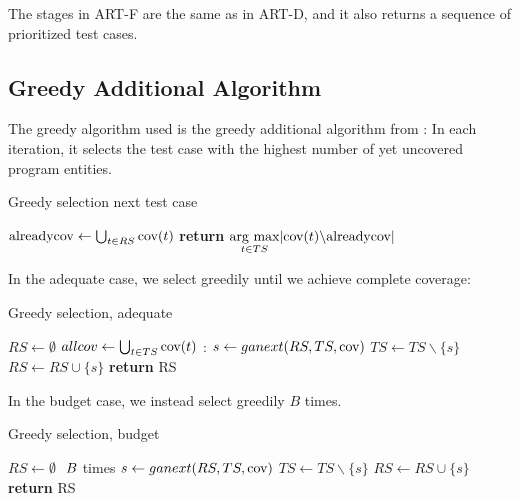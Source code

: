 The stages in ART-F are the same as in ART-D, and it also returns a
sequence of prioritized test cases.

\subsection{Greedy Additional Algorithm}

The greedy algorithm used is the greedy additional algorithm from
\cite{rothermel2001prioritizing}: In each iteration, it selects the test
case with the highest number of yet uncovered program entities.

\begin{algorithm}
\caption[Greedy selection next test case]{Greedy selection next test case}\label{code:ganext}
\begin{algorithmic}
	\State $\hbox{alreadycov} \gets \bigcup_{t \in RS} \hbox{cov}(t)$
	\State \textbf{return} $\underset{t \in TS}{\hbox{arg max}} |\hbox{cov}(t)\backslash \hbox{alreadycov}|$
\EndFunction
\end{algorithmic}
\end{algorithm}

In the adequate case, we select greedily until we achieve complete
coverage:

\begin{algorithm}
\caption[Greedy selection, adequate]{Greedy selection, adequate}\label{code:gaadequate}
\begin{algorithmic}
	\State $RS \gets \emptyset$
	\State $allcov \gets \bigcup_{t \in TS} \hbox{cov}(t)$
	:
		\State $s \gets ganext(RS, TS, \hbox{cov})$
		\State $TS \gets TS \backslash \{s\}$
		\State $RS \gets RS \cup \{s\}$
	\EndWhile
	\State \textbf{return} RS
\EndFunction
\end{algorithmic}
\end{algorithm}

In the budget case, we instead select greedily $B$ times.

\begin{algorithm}
\caption[Greedy selection, budget]{Greedy selection, budget}\label{code:gabudget}
\begin{algorithmic}
	\State $RS \gets \emptyset$
	\For $\hbox{ }B$ times
		\State $s \gets ganext(RS, TS, \hbox{cov})$
		\State $TS \gets TS \backslash \{s\}$
		\State $RS \gets RS \cup \{s\}$
	\EndFor
	\State \textbf{return} RS
\EndFunction
\end{algorithmic}
\end{algorithm}
